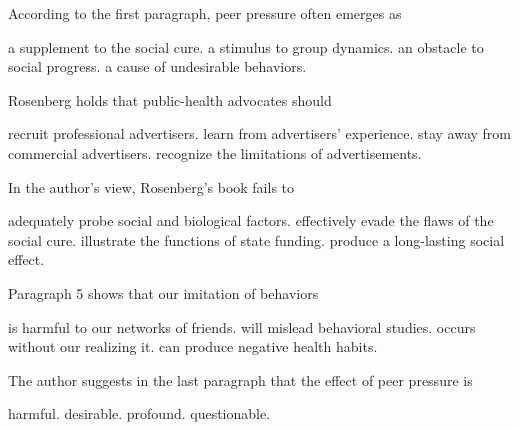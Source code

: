 \item According to the first paragraph, peer pressure often emerges as
\begin{tasks}
	\task a supplement to the social cure.
	\task a stimulus to group dynamics.
	\task an obstacle to social progress.
	\task a cause of undesirable behaviors.
\end{tasks}
\item Rosenberg holds that public-health advocates should
\begin{tasks}
	\task recruit professional advertisers.
	\task learn from advertisers' experience.
	\task stay away from commercial advertisers.
	\task recognize the limitations of advertisements.
\end{tasks}
\item In the author's view, Rosenberg's book fails to
\begin{tasks}
	\task adequately probe social and biological factors.
	\task effectively evade the flaws of the social cure.
	\task illustrate the functions of state funding.
	\task produce a long-lasting social effect.
\end{tasks}
\item Paragraph 5 shows that our imitation of behaviors
\begin{tasks}
	\task is harmful to our networks of friends.
	\task will mislead behavioral studies.
	\task occurs without our realizing it.
	\task can produce negative health habits.
\end{tasks}
\item The author suggests in the last paragraph that the effect of peer pressure is
\begin{tasks}
	\task harmful.
	\task desirable.
	\task profound.
	\task questionable.
\end{tasks}